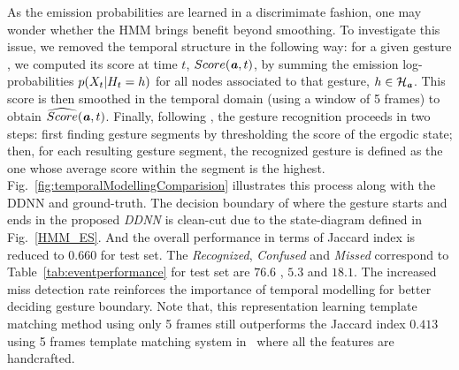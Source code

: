 %
As the emission probabilities are learned in a discrimimate fashion, one may wonder whether the HMM brings benefit beyond smoothing.
To investigate this issue, we removed the temporal structure in the following way:
for a given gesture \gesturea, we computed its score at time $t$, $Score(\textbf{\emph{a}},t)$, by summing the emission
log-probabilities $p(X_t|H_t = h)$ for all nodes associated to that gesture,
\ie $h \in \mathcal{H}_{\textbf{\emph{a}}}$.
%
This score is then smoothed in the temporal domain (using a window of 5 frames) to obtain $\widehat{Score}(\textbf{\emph{a}},t)$.
%
Finally, following \cite{neverova2014moddrop}, the gesture recognition proceeds in two steps:
first finding gesture segments by thresholding the score of the ergodic state;
then, for each resulting gesture segment, the recognized gesture is defined as the one whose average score within the segment is the highest.
%
Fig.~\ref{fig:temporalModellingComparision} illustrates this process along with the DDNN and ground-truth.
%
%
The decision boundary of where the gesture starts and ends in the proposed \emph{DDNN} is clean-cut due to the state-diagram defined in Fig.~\ref{HMM_ES}. And the overall performance in terms of  Jaccard index is reduced to $0.660$ for test set.
The \emph{Recognized}, \emph{Confused} and \emph{Missed} correspond to Table~\ref{tab:eventperformance} for test set are  $76.6$ , $5.3$ and $18.1$. The increased miss detection rate reinforces the importance of temporal modelling for better deciding gesture boundary.
 Note that, this representation learning template matching method using only 5 frames still outperforms the Jaccard index $0.413$ using 5 frames template matching system in~\cite{camgoz2014gesture} where all the features are handcrafted.

